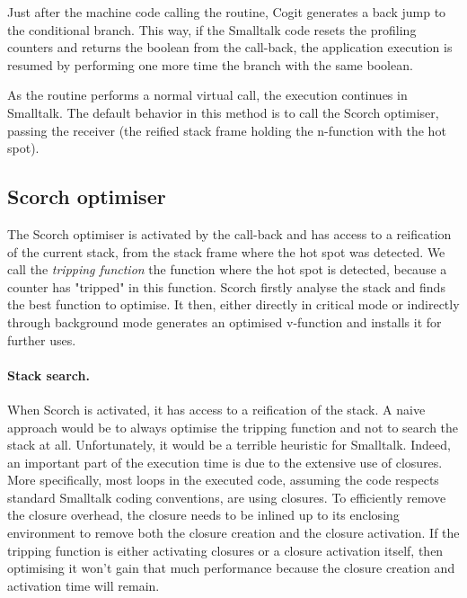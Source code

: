 \documentclass[a4paper,12pt,twoside]{../includes/ThesisStyle}
\begin{document}

Just after the machine code calling the routine, Cogit generates a back jump to the conditional branch. This way, if the Smalltalk code resets the profiling counters and returns the boolean from the call-back, the application execution is resumed by performing one more time the branch with the same boolean.


As the routine performs a normal virtual call, the execution continues in Smalltalk. The default behavior in this method is to call the Scorch optimiser, passing the receiver (the reified stack frame holding the n-function with the hot spot).

\subsection{Scorch optimiser}

The Scorch optimiser is activated by the call-back and has access to a reification of the current stack, from the stack frame where the hot spot was detected. We call the \emph{tripping function} the function where the hot spot is detected, because a counter has "tripped" in this function. Scorch firstly analyse the stack and finds the best function to optimise. It then, either directly in critical mode or indirectly through background mode generates an optimised v-function and installs it for further uses.

\paragraph{Stack search.}
\label{ss:stackSearch}

When Scorch is activated, it has access to a reification of the stack. A naive approach would be to always optimise the tripping function and not to search the stack at all. Unfortunately, it would be a terrible heuristic for Smalltalk. Indeed, an important part of the execution time is due to the extensive use of closures. More specifically, most loops in the executed code, assuming the code respects standard Smalltalk coding conventions, are using closures. To efficiently remove the closure overhead, the closure needs to be inlined up to its enclosing environment to remove both the closure creation and the closure activation. If the tripping function is either activating closures or a closure activation itself, then optimising it won't gain that much performance because the closure creation and activation time will remain.
\end{document}

